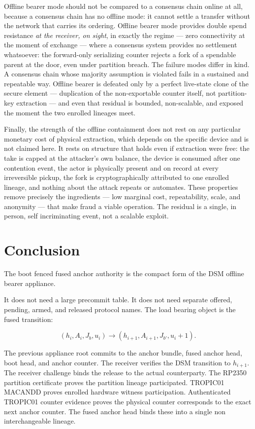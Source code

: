 \documentclass[11pt]{article}
\theoremstyle{definition}
\theoremstyle{remark}
\newcommand{\Ahead}{\ensuremath{A}}
\newcommand{\Bhead}{\ensuremath{J}}
\begin{document}
Offline bearer mode should not be compared to a consensus chain online at all, because a consensus
chain has no offline mode: it cannot settle a transfer without the network that carries its ordering.
Offline bearer mode provides double spend resistance \emph{at the receiver, on sight}, in exactly the
regime --- zero connectivity at the moment of exchange --- where a consensus system provides no
settlement whatsoever: the forward-only serializing counter rejects a fork of a spendable parent at the
door, even under partition breach. The failure modes differ in kind. A consensus chain whose majority
assumption is violated fails in a sustained and repeatable way. Offline bearer is defeated only by a
perfect live-state clone of the secure element --- duplication of the non-exportable counter itself,
not partition-key extraction --- and even that residual is bounded, non-scalable, and exposed the
moment the two enrolled lineages meet.

Finally, the strength of the offline containment does not rest on any particular monetary cost of
physical extraction, which depends on the specific device and is not claimed here. It rests on
structure that holds even if extraction were free: the take is capped at the attacker's own balance,
the device is consumed after one contention event, the actor is physically present and on record at
every irreversible pickup, the fork is cryptographically attributed to one enrolled lineage, and
nothing about the attack repeats or automates. These properties remove precisely the ingredients ---
low marginal cost, repeatability, scale, and anonymity --- that make fraud a viable operation. The
residual is a single, in person, self incriminating event, not a scalable exploit.

\section{Conclusion}

The boot fenced fused anchor authority is the compact form of the DSM offline bearer appliance.

It does not need a large precommit table. It does not need separate offered, pending, armed, and
released protocol names. The load bearing object is the fused transition:

\[
(h_i,\Ahead_i,\Bhead_b,u_i)
\rightarrow
(h_{i+1},\Ahead_{i+1},\Bhead_{b'},u_i+1).
\]

The previous appliance root commits to the anchor bundle, fused anchor head, boot head, and anchor
counter. The receiver verifies the DSM transition to \(h_{i+1}\). The receiver challenge binds the
release to the actual counterparty. The RP2350 partition certificate proves the partition lineage
participated. TROPIC01 MACANDD proves enrolled hardware witness participation. Authenticated
TROPIC01 counter evidence proves the physical counter corresponds to the exact next anchor counter.
The fused anchor head binds these into a single non interchangeable lineage.
\end{document}
